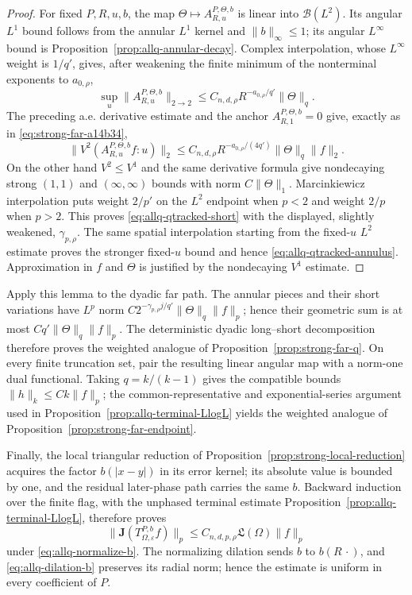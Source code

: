 \documentclass[11pt]{article}
\numberwithin{equation}{section}
\theoremstyle{remark}
\theoremstyle{definition}
\begin{document}
\begin{proof}
For fixed $P,R,u,b$, the map
$\Theta\mapsto A^{P,\Theta,b}_{R,u}$ is linear into
$\mathcal B(L^2)$.  Its angular $L^1$ bound follows from the annular
$L^1$ kernel and $\|b\|_\infty\le1$; its angular $L^\infty$ bound is
Proposition~\ref{prop:allq-annular-decay}.  Complex interpolation, whose
$L^\infty$ weight is $1/q'$, gives, after weakening the finite minimum of
the nonterminal exponents to $a_{0,\rho}$,
\[
 \sup_u\|A^{P,\Theta,b}_{R,u}\|_{2\to2}
 \le C_{n,d,\rho}R^{-a_{0,\rho}/q'}\|\Theta\|_q.
\]
The preceding a.e. derivative estimate and the anchor
$A^{P,\Theta,b}_{R,1}=0$ give, exactly as in
\eqref{eq:strong-far-a14b34},
\[
 \|V^2(A^{P,\Theta,b}_{R,u}f:u)\|_2
 \le C_{n,d,\rho}R^{-a_{0,\rho}/(4q')}
       \|\Theta\|_q\|f\|_2.
\]
On the other hand $V^2\le V^1$ and the same derivative formula give
nondecaying strong $(1,1)$ and $(\infty,\infty)$ bounds with norm
$C\|\Theta\|_1$.  Marcinkiewicz interpolation puts weight $2/p'$ on the
$L^2$ endpoint when $p<2$ and weight $2/p$ when $p>2$.  This proves
\eqref{eq:allq-qtracked-short} with the displayed, slightly weakened,
$\gamma_{p,\rho}$.  The same spatial interpolation starting from the
fixed-$u$ $L^2$ estimate proves the stronger fixed-$u$ bound and hence
\eqref{eq:allq-qtracked-annulus}.  Approximation in $f$ and $\Theta$ is
justified by the nondecaying $V^1$ estimate.
\end{proof}

Apply this lemma to the dyadic far path.  The annular pieces and their short
variations have $L^p$ norm
$C2^{-\gamma_{p,\rho}j/q'}\|\Theta\|_q\|f\|_p$; hence their geometric sum
is at most $Cq'\|\Theta\|_q\|f\|_p$.  The deterministic dyadic
long--short decomposition therefore proves the weighted analogue of
Proposition~\ref{prop:strong-far-q}.  On every finite truncation set, pair
the resulting linear angular map with a norm-one dual functional.  Taking
$q=k/(k-1)$ gives the compatible bounds $\|h\|_k\le Ck\|f\|_p$; the
common-representative and exponential-series argument used in
Proposition~\ref{prop:allq-terminal-LlogL} yields the weighted analogue of
Proposition~\ref{prop:strong-far-endpoint}.

Finally, the local triangular reduction of
Proposition~\ref{prop:strong-local-reduction} acquires the factor
$b(|x-y|)$ in its error kernel; its absolute value is bounded by one, and
the residual later-phase path carries the same $b$. Backward induction
over the finite flag, with the unphased terminal estimate
Proposition~\ref{prop:allq-terminal-LlogL}, therefore proves
\begin{equation}\label{eq:allq-strong-core}
 \|\mathbf J(T^{P,b}_{\Omega,\varepsilon}f)\|_p
 \le C_{n,d,p,\rho}\mathfrak L(\Omega)\|f\|_p
\end{equation}
under \eqref{eq:allq-normalize-b}. The normalizing dilation sends $b$ to
$b(R\,\cdot)$, and \eqref{eq:allq-dilation-b} preserves its radial norm;
hence the estimate is uniform in every coefficient of $P$.
\end{document}
